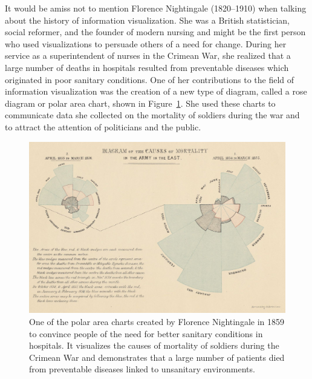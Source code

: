 It would be amiss not to mention Florence Nightingale (1820--1910)
\parencite{FlorenceNightingale, NightingaleBook} when talking about
the history of information visualization. She was a British
statistician, social reformer, and the founder of modern nursing and
might be the first person who used visualizations to persuade others
of a need for change. During her service as a superintendent of nurses
in the Crimean War, she realized that a large number of deaths in
hospitals resulted from preventable diseases which originated in poor
sanitary conditions. One of her contributions to the field of
information visualization was the creation of a new type of diagram,
called a rose diagram or polar area chart, shown in
Figure~\ref{fig:NightingalePolarAreaChart}. She used these charts to
communicate data she collected on the mortality of soldiers during the
war and to attract the attention of politicians and the public.


\begin{figure}[tp]
\centering
\includegraphics[keepaspectratio,width=\linewidth,height=\thirdh]
{images/nightingale.jpg}
\caption[Polar Area Chart by Florence Nightingale from 1859]{%
One of the polar area charts created by Florence Nightingale in 1859
to convince people of the need for better sanitary conditions in
hospitals. It visualizes the causes of mortality of soldiers during
the Crimean War and demonstrates that a large number of patients
died from preventable diseases linked to unsanitary environments.
}
\label{fig:NightingalePolarAreaChart}
\end{figure}




